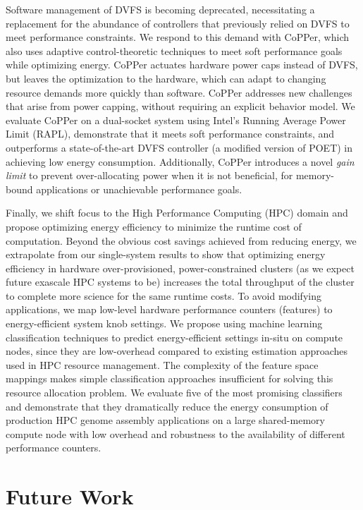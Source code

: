 Software management of DVFS is becoming deprecated, necessitating a replacement for the abundance of controllers that previously relied on DVFS to meet performance constraints.
We respond to this demand with CoPPer, which also uses adaptive control-theoretic techniques to meet soft performance goals while optimizing energy.
CoPPer actuates hardware power caps instead of DVFS, but leaves the optimization to the hardware, which can adapt to changing resource demands more quickly than software.
CoPPer addresses new challenges that arise from power capping, without requiring an explicit behavior model.
We evaluate CoPPer on a dual-socket system using Intel's Running Average Power Limit (RAPL), demonstrate that it meets soft performance constraints, and outperforms a state-of-the-art DVFS controller (a modified version of POET) in achieving low energy consumption.
Additionally, CoPPer introduces a novel \emph{gain limit} to prevent over-allocating power when it is not beneficial, \eg for memory-bound applications or unachievable performance goals.

Finally, we shift focus to the High Performance Computing (HPC) domain and propose optimizing energy efficiency to minimize the runtime cost of computation.
Beyond the obvious cost savings achieved from reducing energy, we extrapolate from our single-system results to show that optimizing energy efficiency in hardware over-provisioned, power-constrained clusters (as we expect future exascale HPC systems to be) increases the total throughput of the cluster to complete more science for the same runtime costs.
To avoid modifying applications, we map low-level hardware performance counters (features) to energy-efficient system knob settings.
We propose using machine learning classification techniques to predict energy-efficient settings in-situ on compute nodes, since they are low-overhead compared to existing estimation approaches used in HPC resource management.
The complexity of the feature space mappings makes simple classification approaches insufficient for solving this resource allocation problem.
We evaluate five of the most promising classifiers and demonstrate that they dramatically reduce the energy consumption of production HPC genome assembly applications on a large shared-memory compute node with low overhead and robustness to the availability of different performance counters.


\section{Future Work}

